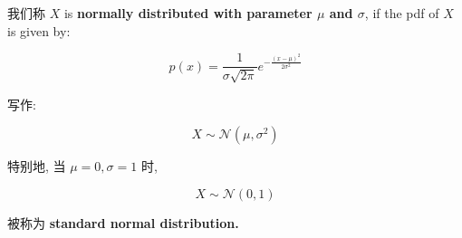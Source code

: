\documentclass{qlnotes-export}
\begin{document}
\begin{definition}\label{def-02-random-variables-definition-017}

我们称 \(X\) is \textbf{normally distributed with parameter \(\mu\) and \(\sigma\)}, if the pdf of \(X\) is given by:

\[p(x) = \frac{1}{\sigma\sqrt{2\pi}}e^{- \frac{(x - \mu)^{2}}{2\sigma^{2}}}\]

写作:

\[X \sim \mathcal{N}(\mu,\sigma^{2})\]

特别地, 当 \(\mu = 0,\sigma = 1\) 时,

\[X \sim \mathcal{N}(0,1)\]

被称为 \textbf{standard normal distribution.}

\end{definition}
\end{document}
